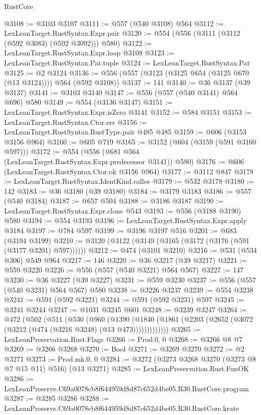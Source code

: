 \begin{lexlean}{RustCore}
\begin{coremodule}
@3108 := @3103 @3107
@3111 := @557 (@540 @3108) @564
@3112 := LexLeanTarget.RustSyntax.Expr.pair
@3120 := @554 (@556 (@3111 (@3112 (@592 @3083) (@592 @3092))) @580)
@3122 := LexLeanTarget.RustSyntax.Expr.loop @3108
@3123 := LexLeanTarget.RustSyntax.Pat.tuple
@3124 := LexLeanTarget.RustSyntax.Pat
@3125 := @2 @3124
@3136 := @556 (@557 (@3123 (@3125 @654 (@3125 @670 (@13 @3124)))) @564 (@592 @3108))
@3137 := 141
@3140 := @36 @3137 (@39 @3137)
@3141 := @3103 @3140
@3147 := @556 (@557 (@540 @3141) @564 @696) @580
@3149 := @554 (@3136 @3147)
@3151 := LexLeanTarget.RustSyntax.Expr.isZero @3141
@3152 := @584 @3151
@3153 := LexLeanTarget.RustSyntax.Ctor.err
@3156 := LexLeanTarget.RustSyntax.RustType.pair @485 @485
@3159 := @606 (@3153 @3156 @964)
@3160 := @605 @719
@3165 := @3152 (@604 (@3159 (@591 @3160 @597)))
@3172 := @554 (@556 (@681 @564 (LexLeanTarget.RustSyntax.Expr.predecessor @3141)) @580)
@3176 := @606 (LexLeanTarget.RustSyntax.Ctor.ok @3156 @964)
@3177 := @3112 @847
@3178 := LexLeanTarget.RustSyntax.IdentKind.callee
@3179 := @532 @3178
@3180 := 142
@3183 := @36 @3180 (@39 @3180)
@3184 := @3179 @3183
@3186 := @557 (@540 @3184)
@3187 := @657 @504
@3188 := @3186 @3187
@3190 := LexLeanTarget.RustSyntax.Expr.clone @543
@3193 := @556 (@3188 @3190) @580
@3194 := @554 @3193
@3196 := LexLeanTarget.RustSyntax.Expr.apply @3184
@3197 := @784 @597
@3199 := @3196 @3197 @516
@3201 := @683 (@3194 @3199)
@3210 := @3120 (@3122 (@3149 (@3165 (@3172 (@3176 (@591 (@3177 @3201) @597))))))
@3212 := @474 (@3101 @3210)
@3216 := @531 (@534 @306) @549 @964
@3217 := 146
@3220 := @36 @3217 (@39 @3217)
@3221 := @559 @3220
@3226 := @556 (@557 (@540 @3221) @564 @567)
@3227 := 147
@3230 := @36 @3227 (@39 @3227)
@3231 := @559 @3230
@3237 := @556 (@557 (@540 @3231) @564 @567) @580
@3238 := @3226 @3237
@3239 := @554 @3238
@3241 := @591 (@592 @3221)
@3244 := @591 (@592 @3231) @597
@3245 := @3241 @3244
@3247 := @1031 @3245 @601
@3248 := @3239 @3247
@3264 := @472
    (@502
      (@511
        (@530
          (@960
            (@1390
              (@1840 (@1861 (@2203 (@2652 (@3072 (@3212 (@474 (@3216 @3248) (@13 @473)))))))))))))
@3265 := LexLeanPreservation.Rust.Flags
@3266 := Prod.{0, 0}
@3268 := @3266 @8 @7
@3269 := @3266 @3268
@3270 := Bool
@3271 := @3269 @3270
@3272 := @2 @3271
@3273 := Prod.mk.{0, 0}
@3284 := @3272 (@3273 @3268 @3270 (@3273 @8 @7 @15 @11) @516) (@13 @3271)
@3285 := LexLeanPreservation.Rust.FunOK
@3286 := LexLeanPreserve.C69a0078cb8f644959d8d87c652d4be05.R30.RustCore.program
@3287 := @3285 @3286
@3288 := LexLeanPreserve.C69a0078cb8f644959d8d87c652d4be05.R30.RustCore.krate

\end{coremodule}
\end{lexlean}
